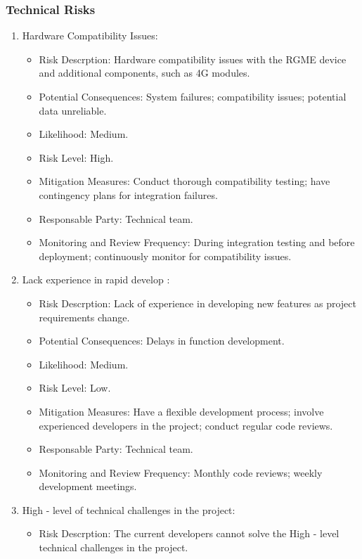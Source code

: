 \documentclass{article}
\begin{document}
\subsubsection{Technical Risks}
\begin{enumerate}
    \item Hardware Compatibility Issues:
    \begin{itemize}
        \item Risk Descrption: Hardware compatibility issues with the RGME device and additional components, such as 4G modules.
        \item Potential Consequences: System failures; compatibility issues; potential data unreliable.
        \item Likelihood: Medium.
        \item Risk Level: High.
        \item Mitigation Measures: Conduct thorough compatibility testing; have contingency plans for integration failures.
        \item Responsable Party: Technical team.
        \item Monitoring and Review Frequency: During integration testing and before deployment; continuously monitor for compatibility issues.
    \end{itemize}
    \item Lack experience in rapid develop :
    \begin{itemize}
        \item Risk Descrption: Lack of experience in developing new features as project requirements change.
        \item Potential Consequences: Delays in function development.
        \item Likelihood: Medium.
        \item Risk Level: Low.
        \item Mitigation Measures: Have a flexible development process; involve experienced developers in the project; conduct regular code reviews.
        \item Responsable Party: Technical team.
        \item Monitoring and Review Frequency: Monthly code reviews; weekly development meetings.
    \end{itemize}
    \item High - level of technical challenges in the project:
    \begin{itemize}
        \item Risk Descrption: The current developers cannot solve the High - level technical challenges in the project.

\end{itemize}
\end{enumerate}
\end{document}
